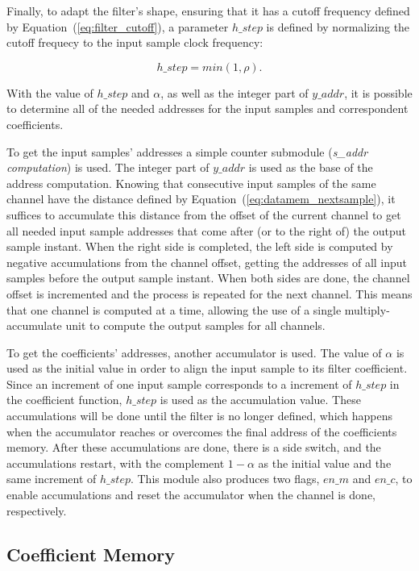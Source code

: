 Finally, to adapt the filter's shape, ensuring that it has a cutoff frequency
defined by Equation~(\ref{eq:filter_cutoff}), a parameter $h\_step$ is defined
by normalizing the cutoff frequecy to the input sample clock frequency:

\begin{equation}
  h\_step = min(1, \rho).
  \label{eq:h_step}
\end{equation}

With the value of $h\_step$ and $\alpha$, as well as the integer part of
$y\_addr$, it is possible to determine all of the needed addresses for the input
samples and correspondent coefficients.

To get the input samples' addresses a simple counter submodule
(\textit{s\_addr  computation}) is used.
The integer part of $y\_addr$ is used as the base of the address computation.
Knowing that consecutive input samples of the same channel have the distance defined by
Equation~(\ref{eq:datamem_nextsample}), it suffices to accumulate this distance
from the offset of the current channel to get all needed input sample addresses
that come after (or to the right of) the output sample instant. When the right
side is completed, the left side is computed by negative accumulations from the
channel offset, getting the addresses of all input samples before the output
sample instant. When both sides are done, the channel offset is incremented and
the process is repeated for the next channel. This means that one channel is
computed at a time, allowing the use of a single multiply-accumulate unit to
compute the output samples for all channels.


To get the coefficients' addresses, another accumulator is used. The value of
$\alpha$ is used as the initial value in order to align the input sample to its
filter coefficient. Since an increment of one input sample corresponds to a
increment of $h\_step$ in the coefficient function, $h\_step$ is used as the
accumulation value. These accumulations will be done until the filter is no
longer defined, which happens when the accumulator reaches or overcomes the
final address of the coefficients memory. After these accumulations are done,
there is a side switch, and the accumulations restart, with the complement
$1-\alpha$ as the initial value and the same increment of $h\_step$. This module
also produces two flags, $en\_m$ and $en\_c$, to enable accumulations and reset
the accumulator when the channel is done, respectively.

\subsection{Coefficient Memory}
\label{subsection:coeff_mem}

